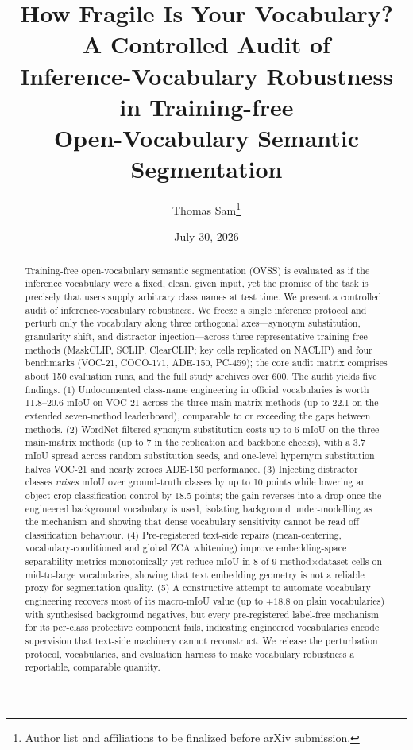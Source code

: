 \documentclass[11pt]{article}
\title{How Fragile Is Your Vocabulary? A Controlled Audit of\\
Inference-Vocabulary Robustness in Training-free\\
Open-Vocabulary Semantic Segmentation}
\author{Thomas Sam\thanks{Author list and affiliations to be finalized before arXiv submission.}}
\date{July 30, 2026}
\newcommand{\miou}{mIoU}
\begin{document}
\maketitle

\begin{abstract}
Training-free open-vocabulary semantic segmentation (OVSS) is evaluated as if the
inference vocabulary were a fixed, clean, given input, yet the promise of the task is
precisely that users supply arbitrary class names at test time. We present a controlled
audit of inference-vocabulary robustness. We freeze a single inference protocol and
perturb only the vocabulary along three orthogonal axes---synonym substitution,
granularity shift, and distractor injection---across three representative training-free
methods (MaskCLIP, SCLIP, ClearCLIP; key cells replicated on NACLIP) and four
benchmarks (VOC-21, COCO-171, ADE-150, PC-459); the core audit matrix comprises
about 150 evaluation runs, and the full study archives over 600. The audit yields five findings.
(1) Undocumented class-name engineering in official vocabularies is worth
11.8--20.6 \miou{} on VOC-21 across the three main-matrix methods (up to 22.1 on
the extended seven-method leaderboard), comparable to or exceeding the
gaps between methods.
(2) WordNet-filtered synonym substitution costs up to 6 \miou{} on the three
main-matrix methods (up to 7 in the replication and backbone checks), with a 3.7 \miou{}
spread across random substitution seeds, and one-level hypernym substitution halves
VOC-21 and nearly zeroes ADE-150 performance.
(3) Injecting distractor classes \emph{raises} \miou{} over ground-truth classes by up
to 10 points while lowering an object-crop classification control by 18.5 points; the
gain reverses into a drop once the engineered background vocabulary is used, isolating
background under-modelling as the mechanism and showing that dense vocabulary
sensitivity cannot be read off classification behaviour.
(4) Pre-registered text-side repairs (mean-centering, vocabulary-conditioned and global
ZCA whitening) improve embedding-space separability metrics monotonically yet reduce
\miou{} in 8 of 9 method$\times$dataset cells on mid-to-large vocabularies, showing
that text embedding geometry is not a reliable proxy for segmentation quality.
(5) A constructive attempt to automate vocabulary engineering recovers most of its
macro-\miou{} value (up to $+18.8$ on plain vocabularies) with synthesised background
negatives, but every pre-registered label-free mechanism for its per-class protective
component fails, indicating engineered vocabularies encode supervision that text-side
machinery cannot reconstruct. We release the perturbation protocol, vocabularies, and
evaluation harness to make vocabulary robustness a reportable, comparable quantity.
\end{abstract}
\end{document}
